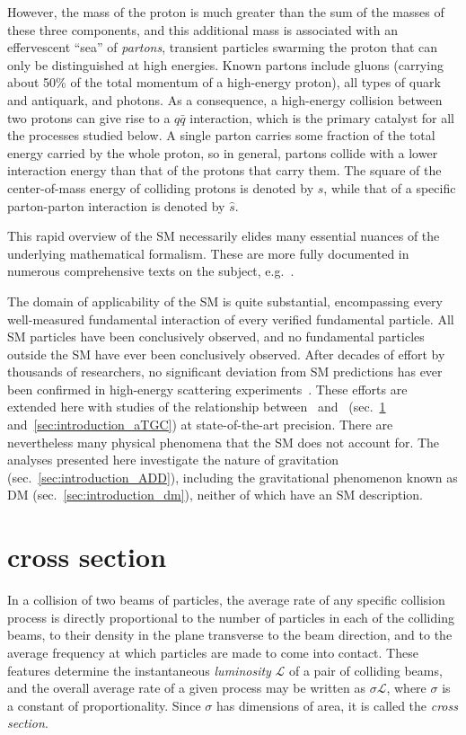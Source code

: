 \documentclass[oneside, letterpaper, 12pt, oldfontcommands]{memoir}
\begin{document}
However, the mass of the proton is much greater than the sum of the masses of these three components, and this additional mass is associated with an effervescent
``sea'' of \textit{partons}, transient particles swarming the proton that can only be distinguished at high energies.
Known partons include gluons (carrying about 50\% of the total momentum of a high-energy proton),
all types of quark and antiquark, and photons. As a consequence, a high-energy collision between two protons can give rise to a $q\bar{q}$ interaction,
which is the primary catalyst for all the processes studied below. A single parton carries some fraction of the total energy carried by the whole proton,
so in general, partons collide with a lower interaction energy than that of the protons that carry them.
The square of the center-of-mass energy of colliding protons is denoted by $s$, while that of a specific
parton-parton interaction is denoted by $\hat{s}$.

This rapid overview of the SM necessarily elides many essential nuances of the underlying mathematical formalism. These are more fully
documented in numerous comprehensive texts on the subject, e.g.~\cite{ref:HalzenMartin, ref:BargerPhillips, ref:PeskinSchroeder, ref:Srednicki, ref:Schwartz}.

The domain of applicability of the SM is quite substantial, encompassing
every well-measured fundamental interaction of every verified fundamental particle. All SM particles have been conclusively observed,
and no fundamental particles outside the SM have ever been conclusively observed. After decades of effort by thousands of researchers,
no significant deviation from SM predictions has ever been confirmed in high-energy scattering experiments~\cite{ref:PDG}.
These efforts are extended here with studies of the relationship between \PZ\ and \Pgamma\ (sec.~\ref{sec:introduction_znng} and~\ref{sec:introduction_aTGC}) at state-of-the-art precision.
There are nevertheless many physical phenomena that the SM does not account for.
The analyses presented here investigate the nature of gravitation (sec.~\ref{sec:introduction_ADD}),
including the gravitational phenomenon known as DM (sec.~\ref{sec:introduction_dm}), neither of which have an SM description.

\section{\texorpdfstring{\zinvg}{Z(νν)γ} cross section} \label{sec:introduction_znng}
In a collision of two beams of particles, the average rate of any specific collision process is directly proportional to the
number of particles in each of the colliding beams, to their density in the plane transverse to the beam direction, and to the average
frequency at which particles are made to come into contact. These features determine the instantaneous \textit{luminosity} $\mathcal{L}$ of a pair
of colliding beams, and the overall average rate of a given process may be written as $\sigma \mathcal{L}$, where $\sigma$
is a constant of proportionality. Since $\sigma$ has dimensions of area, it is called the \textit{cross section}.
\end{document}
